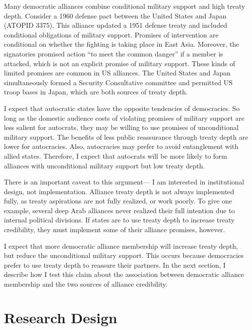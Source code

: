 \documentclass[12pt]{article}
\begin{document}
Many democratic alliances combine conditional military support and high treaty depth. 
Consider a 1960 defense pact between the United States and Japan (ATOPID 3375).
This alliance updated a 1951 defense treaty and included conditional obligations of military support. 
Promises of intervention are conditional on whether the fighting is taking place in East Asia. 
Moreover, the signatories promised action ``to meet the common danger'' if a member is attacked, which is not an explicit promise of military support. 
These kinds of limited promises are common in US alliances. 
The United States and Japan simultaneously formed a Security Consultative committee and permitted US troop bases in Japan, which are both sources of treaty depth. 


I expect that autocratic states have the opposite tendencies of democracies.
So long as the domestic audience costs of violating promises of military support are less salient for autocrats, they may be willing to use promises of unconditional military support. 
The benefits of less public reassurance through treaty depth are lower for autocracies. 
Also, autocracies may prefer to avoid entanglement with allied states. 
Therefore, I expect that autocrats will be more likely to form alliances with unconditional military support but low treaty depth. 


There is an important caveat to this argument--- I am interested in institutional design, not implementation.
Alliance treaty depth is not always implemented fully, as treaty aspirations are not fully realized, or work poorly. 
To give one example, several deep Arab alliances never realized their full intention due to internal political divisions.  
If states are to use treaty depth to increase treaty credibility, they must implement some of their alliance promises, however. 


I expect that more democratic alliance membership will increase treaty depth, but reduce the unconditional military support.  
This occurs because democracies prefer to use treaty depth to reassure their partners. 
In the next section, I describe how I test this claim about the association between democratic alliance membership and the two sources of alliance credibility. 




\section{Research Design}
\end{document}

